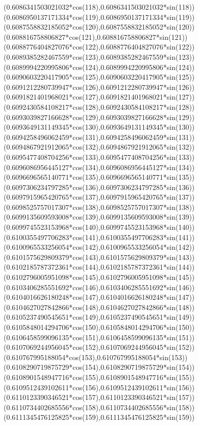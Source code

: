 {({0.6086341503021032*cos(118)},{0.6086341503021032*sin(118)})
({0.6086950137171334*cos(119)},{0.6086950137171334*sin(119)})
({0.6087558832185052*cos(120)},{0.6087558832185052*sin(120)})
({0.608816758806827*cos(121)},{0.608816758806827*sin(121)})
({0.6088776404827076*cos(122)},{0.6088776404827076*sin(122)})
({0.6089385282467559*cos(123)},{0.6089385282467559*sin(123)})
({0.6089994220995806*cos(124)},{0.6089994220995806*sin(124)})
({0.6090603220417905*cos(125)},{0.6090603220417905*sin(125)})
({0.6091212280739947*cos(126)},{0.6091212280739947*sin(126)})
({0.6091821401968021*cos(127)},{0.6091821401968021*sin(127)})
({0.6092430584108217*cos(128)},{0.6092430584108217*sin(128)})
({0.6093039827166628*cos(129)},{0.6093039827166628*sin(129)})
({0.6093649131149345*cos(130)},{0.6093649131149345*sin(130)})
({0.6094258496062459*cos(131)},{0.6094258496062459*sin(131)})
({0.6094867921912065*cos(132)},{0.6094867921912065*sin(132)})
({0.6095477408704256*cos(133)},{0.6095477408704256*sin(133)})
({0.6096086956445127*cos(134)},{0.6096086956445127*sin(134)})
({0.6096696565140771*cos(135)},{0.6096696565140771*sin(135)})
({0.6097306234797285*cos(136)},{0.6097306234797285*sin(136)})
({0.6097915965420765*cos(137)},{0.6097915965420765*sin(137)})
({0.6098525757017307*cos(138)},{0.6098525757017307*sin(138)})
({0.6099135609593008*cos(139)},{0.6099135609593008*sin(139)})
({0.6099745523153968*cos(140)},{0.6099745523153968*sin(140)})
({0.6100355497706283*cos(141)},{0.6100355497706283*sin(141)})
({0.6100965533256054*cos(142)},{0.6100965533256054*sin(142)})
({0.6101575629809379*cos(143)},{0.6101575629809379*sin(143)})
({0.6102185787372361*cos(144)},{0.6102185787372361*sin(144)})
({0.6102796005951098*cos(145)},{0.6102796005951098*sin(145)})
({0.6103406285551692*cos(146)},{0.6103406285551692*sin(146)})
({0.6104016626180248*cos(147)},{0.6104016626180248*sin(147)})
({0.6104627027842866*cos(148)},{0.6104627027842866*sin(148)})
({0.6105237490545651*cos(149)},{0.6105237490545651*sin(149)})
({0.6105848014294706*cos(150)},{0.6105848014294706*sin(150)})
({0.6106458599096135*cos(151)},{0.6106458599096135*sin(151)})
({0.6107069244956045*cos(152)},{0.6107069244956045*sin(152)})
({0.610767995188054*cos(153)},{0.610767995188054*sin(153)})
({0.6108290719875729*cos(154)},{0.6108290719875729*sin(154)})
({0.6108901548947716*cos(155)},{0.6108901548947716*sin(155)})
({0.6109512439102611*cos(156)},{0.6109512439102611*sin(156)})
({0.6110123390346521*cos(157)},{0.6110123390346521*sin(157)})
({0.6110734402685556*cos(158)},{0.6110734402685556*sin(158)})
({0.6111345476125825*cos(159)},{0.6111345476125825*sin(159)})
}
